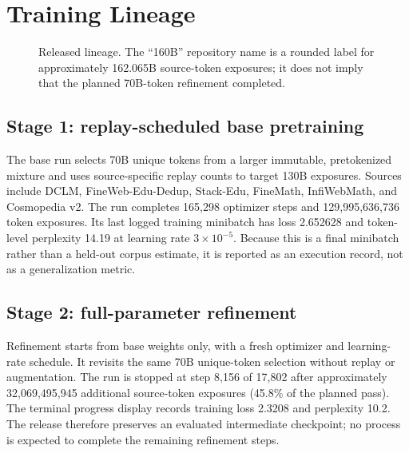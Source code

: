 \documentclass[10pt,twocolumn]{article}
\begin{document}
\section{Training Lineage}
\begin{figure}[t]
\centering
{}
\caption{Released lineage. The ``160B'' repository name is a rounded label for approximately 162.065B source-token exposures; it does not imply that the planned 70B-token refinement completed.}
\label{fig:lineage}
\end{figure}

\subsection{Stage 1: replay-scheduled base pretraining}
The base run selects 70B unique tokens from a larger immutable, pretokenized mixture and uses source-specific replay counts to target 130B exposures. Sources include DCLM, FineWeb-Edu-Dedup, Stack-Edu, FineMath, InfiWebMath, and Cosmopedia v2. The run completes 165,298 optimizer steps and 129,995,636,736 token exposures. Its last logged training minibatch has loss 2.652628 and token-level perplexity 14.19 at learning rate $3\times10^{-5}$. Because this is a final minibatch rather than a held-out corpus estimate, it is reported as an execution record, not as a generalization metric.

\subsection{Stage 2: full-parameter refinement}
Refinement starts from base weights only, with a fresh optimizer and learning-rate schedule. It revisits the same 70B unique-token selection without replay or augmentation. The run is stopped at step 8,156 of 17,802 after approximately 32,069,495,945 additional source-token exposures (45.8\% of the planned pass). The terminal progress display records training loss 2.3208 and perplexity 10.2. The release therefore preserves an evaluated intermediate checkpoint; no process is expected to complete the remaining refinement steps.
\end{document}
